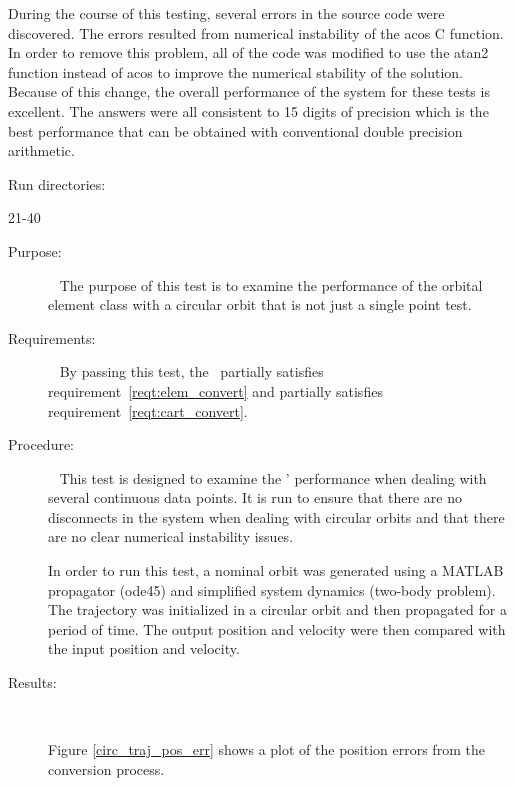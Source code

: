 \begin{description}
During the course of this testing, several errors in the source code were
discovered.  The errors resulted from numerical instability of the acos C function.
In order to remove this problem, all of the code was modified to use the atan2
function instead of acos to improve the numerical stability of the solution.
Because of this change, the overall performance of the system for these tests
is excellent.  The answers were all consistent to 15 digits of precision which
is the best performance that can be obtained with conventional double precision arithmetic.

Run directories:

21-40
\end{description}

\label{test:circ_cont_orb}
\begin{description}
\item[Purpose:] \ \newline
The purpose of this test is to examine the performance of the orbital element
class with a circular orbit that is not just a single point test.
\item[Requirements:] \ \newline
By passing this test, the \OrbitalElement\ partially satisfies
requirement~\ref{reqt:elem_convert} and partially satisfies
requirement~\ref{reqt:cart_convert}.
\item[Procedure:]\ \newline
This test is designed to examine the \OrbitalElement' performance when
dealing with several continuous data points.  It is run to ensure that there
are no disconnects in the system when dealing with circular orbits and that
there are no clear numerical instability issues.

In order to run this test, a nominal orbit was generated using a MATLAB
propagator (ode45) and simplified system dynamics (two-body problem).  The
trajectory was initialized in a circular orbit and then propagated for a period
of time.  The output position and velocity were then compared with the input
position and velocity.

\item[Results:]\ \newline

Figure \ref{circ_traj_pos_err} shows a plot of the position errors from the
conversion process.


\end{description}
